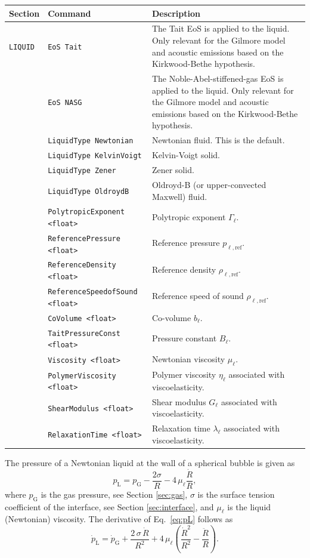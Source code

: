 \noindent
\begin{tabular}{p{} p{} p{}}
    \textbf{Section} &\textbf{Command} & \textbf{Description} 
\vspace{1mm} \\ \hline
{\tt LIQUID} & {\tt EoS Tait} & The Tait EoS is applied to the liquid. Only relevant for the Gilmore model and acoustic emissions based on the Kirkwood-Bethe hypothesis.\\ 
& {\tt EoS NASG} & The Noble-Abel-stiffened-gas EoS is applied to the liquid. Only relevant for the Gilmore model and acoustic emissions based on the Kirkwood-Bethe hypothesis.\\ 
& {\tt LiquidType Newtonian} & Newtonian fluid. This is the default.\\ 
& {\tt LiquidType KelvinVoigt} & Kelvin-Voigt solid.\\ 
& {\tt LiquidType Zener} & Zener solid.\\ 
& {\tt LiquidType OldroydB} & Oldroyd-B (or upper-convected Maxwell) fluid.\\ 
& {\tt PolytropicExponent <float>} & Polytropic exponent $\Gamma_{\ell}$.\\
& {\tt ReferencePressure <float>} & Reference pressure $p_{\ell,\text{ref}}$.\\
& {\tt ReferenceDensity <float>} & Reference density $\rho_{\ell,\text{ref}}$.\\
& {\tt ReferenceSpeedofSound <float>} & Reference speed of sound $\rho_{\ell,\text{ref}}$.\\
& {\tt CoVolume <float>} & Co-volume $b_\ell$.\\
& {\tt TaitPressureConst <float>} & Pressure constant $B_\ell$.\\
& {\tt Viscosity <float>} & Newtonian viscosity $\mu_\ell$.\\
& {\tt PolymerViscosity <float>} & Polymer viscosity $\eta_\ell$ associated with viscoelasticity.\\
& {\tt ShearModulus <float>} & Shear modulus $G_\ell$ associated with viscoelasticity.\\
& {\tt RelaxationTime <float>} & Relaxation time $\lambda_\ell$ associated with viscoelasticity.\\
 \hline
\end{tabular} \vspace{1em}

The pressure of a Newtonian liquid at the wall of a spherical bubble is given as
\begin{equation}
  p_\text{L} = p_\text{G} - \frac{2 \sigma}{R} - 4 \, \mu_\ell \frac{\dot{R}}{R}, \label{eq:pL}
\end{equation}
where $p_\text{G}$ is the gas pressure, see Section \ref{sec:gas}, $\sigma$ is the surface tension coefficient of the interface, see Section \ref{sec:interface}, and $\mu_\ell$ is the liquid (Newtonian) viscosity. The derivative of Eq.~\eqref{eq:pL} follows as
\begin{equation}
  \dot{p}_\mathrm{L} = \dot{p}_\mathrm{G} + \frac{2 \, \sigma \, \dot{R}}{R^2} + 4 \, \mu_\ell \left(\frac{\dot{R}^2}{R^2} - \frac{\ddot{R}}{R}\right).
  \label{eq:dotpL}
\end{equation}

